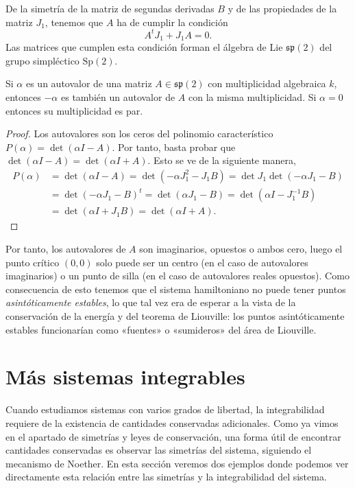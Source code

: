    De la simetría de la matriz de segundas derivadas $B$ y de las propiedades de la matriz $J_1$, tenemos que $A$ ha de cumplir la condición
   \begin{equation*}
     A^{t}J_1+J_1 A=0.
   \end{equation*}
   Las matrices que cumplen esta condición forman el álgebra de Lie $\mathfrak{sp}(2)$ del grupo simpléctico $\mathrm{Sp}(2)$.

   \begin{prop}
     Si $\alpha$ es un autovalor de una matriz $A\in \mathfrak{sp}(2)$ con multiplicidad algebraica $k$, entonces $-\alpha$ es también un autovalor de $A$ con la misma multiplicidad. Si $\alpha=0$ entonces su multiplicidad es par.
   \end{prop}
   \begin{proof}
     Los autovalores son los ceros del polinomio característico $P(\alpha)=\det(\alpha I-A)$. Por tanto, basta probar que $\det(\alpha I-A)=\det(\alpha I + A)$. Esto se ve de la siguiente manera,
     \begin{align*}
       P(\alpha)&=\det(\alpha I-A)=\det(-\alpha J_1^2-J_1B)=\det J_1\det(-\alpha J_1 - B)\\
       &=\det(-\alpha J_1-B)^t=\det (\alpha J_1 - B)=\det(\alpha I - J_1^{-1}B)\\
       &=\det(\alpha I + J_1 B)=\det(\alpha I +A).
     \end{align*}
   \end{proof}
   Por tanto, los autovalores de $A$ son imaginarios, opuestos o ambos cero, luego el punto crítico $(0,0)$ solo puede ser un centro (en el caso de autovalores imaginarios) o un punto de silla (en el caso de autovalores reales opuestos). Como consecuencia de esto tenemos que el sistema hamiltoniano no puede tener puntos \emph{asintóticamente estables}, lo que tal vez era de esperar a la vista de la conservación de la energía y del teorema de Liouville: los puntos asintóticamente estables funcionarían como «fuentes» o «sumideros» del área de Liouville.
   \section{Más sistemas integrables}
   Cuando estudiamos sistemas con varios grados de libertad, la integrabilidad requiere de la existencia de cantidades conservadas adicionales. Como ya vimos en el apartado de simetrías y leyes de conservación, una forma útil de encontrar cantidades conservadas es observar las simetrías del sistema, siguiendo el mecanismo de Noether. En esta sección veremos dos ejemplos donde podemos ver directamente esta relación entre las simetrías y la integrabilidad del sistema.

